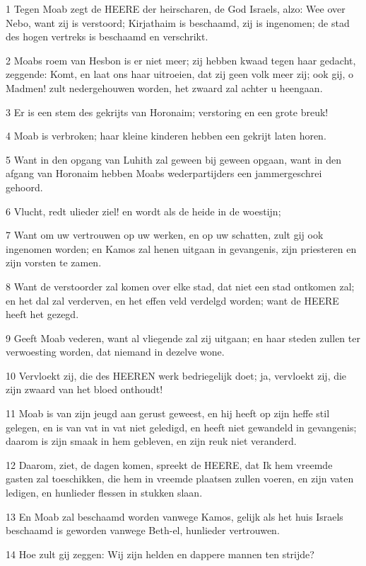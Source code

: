 \par 1 Tegen Moab zegt de HEERE der heirscharen, de God Israels, alzo: Wee over Nebo, want zij is verstoord; Kirjathaim is beschaamd, zij is ingenomen; de stad des hogen vertreks is beschaamd en verschrikt.
\par 2 Moabs roem van Hesbon is er niet meer; zij hebben kwaad tegen haar gedacht, zeggende: Komt, en laat ons haar uitroeien, dat zij geen volk meer zij; ook gij, o Madmen! zult nedergehouwen worden, het zwaard zal achter u heengaan.
\par 3 Er is een stem des gekrijts van Horonaim; verstoring en een grote breuk!
\par 4 Moab is verbroken; haar kleine kinderen hebben een gekrijt laten horen.
\par 5 Want in den opgang van Luhith zal geween bij geween opgaan, want in den afgang van Horonaim hebben Moabs wederpartijders een jammergeschrei gehoord.
\par 6 Vlucht, redt ulieder ziel! en wordt als de heide in de woestijn;
\par 7 Want om uw vertrouwen op uw werken, en op uw schatten, zult gij ook ingenomen worden; en Kamos zal henen uitgaan in gevangenis, zijn priesteren en zijn vorsten te zamen.
\par 8 Want de verstoorder zal komen over elke stad, dat niet een stad ontkomen zal; en het dal zal verderven, en het effen veld verdelgd worden; want de HEERE heeft het gezegd.
\par 9 Geeft Moab vederen, want al vliegende zal zij uitgaan; en haar steden zullen ter verwoesting worden, dat niemand in dezelve wone.
\par 10 Vervloekt zij, die des HEEREN werk bedriegelijk doet; ja, vervloekt zij, die zijn zwaard van het bloed onthoudt!
\par 11 Moab is van zijn jeugd aan gerust geweest, en hij heeft op zijn heffe stil gelegen, en is van vat in vat niet geledigd, en heeft niet gewandeld in gevangenis; daarom is zijn smaak in hem gebleven, en zijn reuk niet veranderd.
\par 12 Daarom, ziet, de dagen komen, spreekt de HEERE, dat Ik hem vreemde gasten zal toeschikken, die hem in vreemde plaatsen zullen voeren, en zijn vaten ledigen, en hunlieder flessen in stukken slaan.
\par 13 En Moab zal beschaamd worden vanwege Kamos, gelijk als het huis Israels beschaamd is geworden vanwege Beth-el, hunlieder vertrouwen.
\par 14 Hoe zult gij zeggen: Wij zijn helden en dappere mannen ten strijde?
